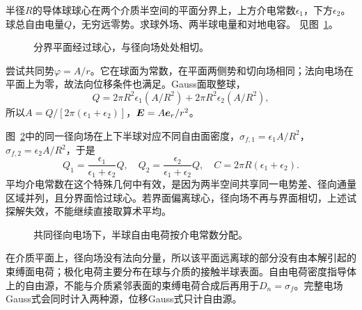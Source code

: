 \begin{example}[分界面上的带电导体球]\label{ex:es4-e5}
半径$R$的导体球球心在两个介质半空间的平面分界上，上方介电常数$\epsilon_1$，下方$\epsilon_2$。球总自由电量$Q$，无穷远零势。求球外场、两半球电量和对地电容。 见图~\ref{fig:es4-e5-q}。
\end{example}

\begin{figure}[H]\centering
{}
\caption{分界平面经过球心，与径向场处处相切。}\label{fig:es4-e5-q}
\end{figure}
\begin{solution}
尝试共同势$\varphi=A/r$。它在球面为常数，在平面两侧势和切向场相同；法向电场在平面上为零，故法向位移条件也满足。Gauss面取整球，
\[Q=2\pi R^2\epsilon_1(A/R^2)+2\pi R^2\epsilon_2(A/R^2),
\]
所以$A=Q/[2\pi(\epsilon_1+\epsilon_2)]$，$\bm{E}=A\bm{e}_r/r^2$。

图~\ref{fig:es4-e5-s}中的同一径向场在上下半球对应不同自由面密度，$\sigma_{f,1}=\epsilon_1A/R^2$，$\sigma_{f,2}=\epsilon_2A/R^2$，于是
\[Q_1=\frac{\epsilon_1}{\epsilon_1+\epsilon_2}Q,\quad
Q_2=\frac{\epsilon_2}{\epsilon_1+\epsilon_2}Q,\quad
\boxed{C=2\pi R(\epsilon_1+\epsilon_2)}.
\]
平均介电常数在这个特殊几何中有效，是因为两半空间共享同一电势差、径向通量区域并列，且分界面恰过球心。若界面偏离球心，径向场不再与界面相切，上述试探解失效，不能继续直接取算术平均。
\begin{figure}[H]\centering
{}
\caption{共同径向电场下，半球自由电荷按介电常数分配。}\label{fig:es4-e5-s}
\end{figure}


在介质平面上，径向场没有法向分量，所以该平面远离球的部分没有由本解引起的束缚面电荷；极化电荷主要分布在球与介质的接触半球表面。自由电荷密度指导体上的自由源，不能与介质紧邻表面的束缚电荷合成后再用于$D_n=\sigma_f$。完整电场Gauss式会同时计入两种源，位移Gauss式只计自由源。
\end{solution}

